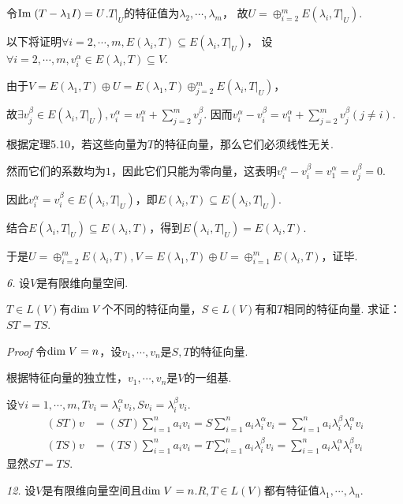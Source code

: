 令\(\mathrm{Im \;}(T-\lambda_1 I)=U\).\(T|_U\)的特征值为\(\lambda_2,\cdots,\lambda_m\)，
故\(U=\oplus_{i=2}^m E(\lambda_i,T|_U)\).

以下将证明\(\forall i=2,\cdots,m,E(\lambda_i,T) \subseteq E(\lambda_i,T|_U)\)，
设\(\forall i=2,\cdots,m,v_i^\alpha \in E(\lambda_i,T) \subseteq V\).

由于\(V=E(\lambda_1,T) \oplus U=E(\lambda_1,T) \oplus_{j=2}^m E(\lambda_i,T|_U)\)，

故\(\exists v_j^\beta \in E(\lambda_i,T|_U),v_i^\alpha=v_1^\alpha+\sum_{j=2}^m v_j^\beta\).
因而\(v_i^\alpha-v_i^\beta=v_1^\alpha+\sum_{j=2}^m v_j^\beta(j \ne i)\).

根据定理5.10，若这些向量为\(T\)的特征向量，那么它们必须线性无关.

然而它们的系数均为\(1\)，因此它们只能为零向量，这表明\(v_i^\alpha-v_i^\beta=v_1^\alpha=v_j^\beta=0\).

因此\(v_i^\alpha=v_i^\beta \in E(\lambda_i,T|_U)\)，即\(E(\lambda_i,T) \subseteq E(\lambda_i,T|_U)\).

结合\(E(\lambda_i,T|_U) \subseteq E(\lambda_i,T)\)，得到\(E(\lambda_i,T|_U)=E(\lambda_i,T)\).

于是\(U=\oplus_{i=2}^m E(\lambda_i,T),V=E(\lambda_1,T) \oplus U=\oplus_{i=1}^m E(\lambda_i,T)\)，证毕.

\newpage

\textit{6.}
设\(V\)是有限维向量空间.

\(T \in L(V)\)有\(\mathrm{dim \;} V\)个不同的特征向量，\(S \in L(V)\)有和\(T\)相同的特征向量.
求证：\(ST=TS\).

\textit{Proof}
令\(\mathrm{dim \;} V=n\)，设\(v_1,\cdots,v_n\)是\(S,T\)的特征向量.

根据特征向量的独立性，\(v_1,\cdots,v_n\)是\(V\)的一组基.

设\(\forall i=1,\cdots,m,Tv_i=\lambda_i^\alpha v_i,Sv_i=\lambda_i^\beta v_i\).
    \begin{align*}
        (ST)v &=(ST)\sum_{i=1}^n a_iv_i=S\sum_{i=1}^n a_i \lambda_i^\alpha v_i
                =\sum_{i=1}^n a_i \lambda_i^\beta \lambda_i^\alpha v_i \\
        (TS)v &=(TS)\sum_{i=1}^n a_iv_i=T\sum_{i=1}^n a_i \lambda_i^\beta v_i
                =\sum_{i=1}^n a_i \lambda_i^\alpha \lambda_i^\beta v_i
    \end{align*}
显然\(ST=TS\).

\hspace*{\fill}

\textit{12.}
设\(V\)是有限维向量空间且\(\mathrm{dim \;} V=n\).\(R,T \in L(V)\)都有特征值\(\lambda_1,\cdots,\lambda_n\).

